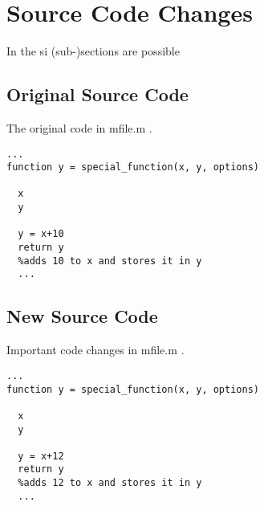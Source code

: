 \chapter{Source Code Changes}
In the \gls{si} (sub-)sections are possible
\section{Original Source Code}
The original code in mfile.m .
\begin{lstlisting}[firstnumber=100]
...
function y = special_function(x, y, options)

  x
  y
  
  y = x+10
  return y
  %adds 10 to x and stores it in y
  ...
\end{lstlisting}

\section{New Source Code}
Important code changes in mfile.m .
\begin{lstlisting}[firstnumber=100]
...
function y = special_function(x, y, options)

  x
  y
  
  y = x+12
  return y
  %adds 12 to x and stores it in y
  ...
\end{lstlisting}
